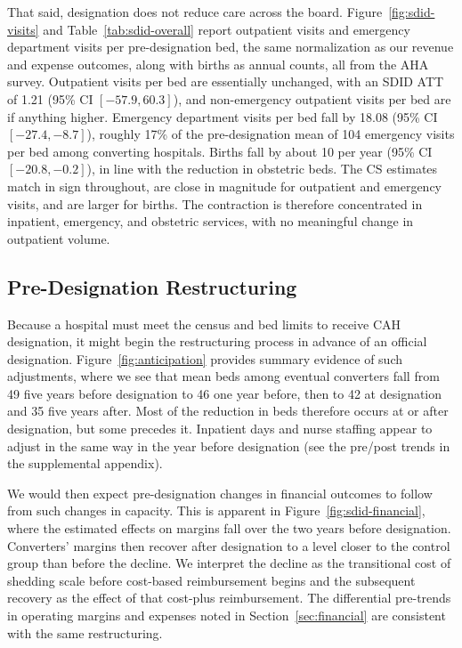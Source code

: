 \documentclass[a4paper, 12pt, twoside]{article}
\begin{document}
That said, designation does not reduce care across the board. Figure~\ref{fig:sdid-visits} and Table~\ref{tab:sdid-overall} report outpatient visits and emergency department visits per pre-designation bed, the same normalization as our revenue and expense outcomes, along with births as annual counts, all from the AHA survey. Outpatient visits per bed are essentially unchanged, with an SDID ATT of 1.21 (95\% CI $[-57.9, 60.3]$), and non-emergency outpatient visits per bed are if anything higher. Emergency department visits per bed fall by 18.08 (95\% CI $[-27.4, -8.7]$), roughly 17\% of the pre-designation mean of 104 emergency visits per bed among converting hospitals. Births fall by about 10 per year (95\% CI $[-20.8, -0.2]$), in line with the reduction in obstetric beds. The CS estimates match in sign throughout, are close in magnitude for outpatient and emergency visits, and are larger for births. The contraction is therefore concentrated in inpatient, emergency, and obstetric services, with no meaningful change in outpatient volume.

\subsection{Pre-Designation Restructuring}
\label{sec:anticipation}

Because a hospital must meet the census and bed limits to receive CAH designation, it might begin the restructuring process in advance of an official designation. Figure~\ref{fig:anticipation} provides summary evidence of such adjustments, where we see that mean beds among eventual converters fall from 49 five years before designation to 46 one year before, then to 42 at designation and 35 five years after. Most of the reduction in beds therefore occurs at or after designation, but some precedes it. Inpatient days and nurse staffing appear to adjust in the same way in the year before designation (see the pre/post trends in the supplemental appendix).

We would then expect pre-designation changes in financial outcomes to follow from such changes in capacity. This is apparent in Figure~\ref{fig:sdid-financial}, where the estimated effects on margins fall over the two years before designation. Converters' margins then recover after designation to a level closer to the control group than before the decline. We interpret the decline as the transitional cost of shedding scale before cost-based reimbursement begins and the subsequent recovery as the effect of that cost-plus reimbursement. The differential pre-trends in operating margins and expenses noted in Section~\ref{sec:financial} are consistent with the same restructuring.
\end{document}
